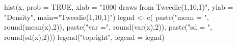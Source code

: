\begin{Schunk}
\begin{Sinput}
  hist(x, prob = TRUE, xlab = "1000 draws from Tweedie(1,10,1)", ylab = "Density", main="Tweedie(1,10,1)")
  legnd <- c( paste("mean = ", round(mean(x),2)), paste("var =", round(var(x),2)), paste("sd = ", round(sd(x),2)))
  legend("topright", legend = legnd)
\end{Sinput}
\end{Schunk}
